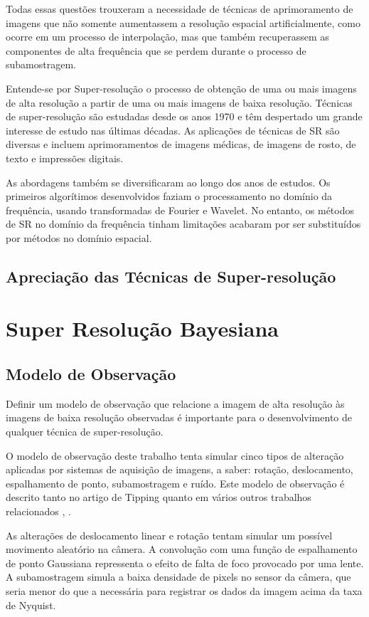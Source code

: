 \documentclass[12pt,openright,oneside,a4paper,english,brazil]{abntex2}
\begin{document}
Todas essas questões trouxeram a necessidade de técnicas de aprimoramento de imagens que não somente aumentassem a resolução espacial artificialmente, como ocorre em um processo de interpolação, mas que também recuperassem as componentes de alta frequência que se perdem durante o processo de subamostragem.

Entende-se por Super-resolução o processo de obtenção de uma ou mais imagens de alta resolução a partir de uma ou mais imagens de baixa resolução.
Técnicas de super-resolução são estudadas desde os anos 1970 e têm despertado um grande interesse de estudo nas últimas décadas.
As aplicações de técnicas de SR são diversas e incluem aprimoramentos de imagens médicas, de imagens de rosto, de texto e impressões digitais\cite{nasrollahi2014super}.

As abordagens também se diversificaram ao longo dos anos de estudos. Os primeiros algorítimos desenvolvidos faziam o processamento no domínio da frequência, usando transformadas de Fourier e Wavelet.
No entanto, os métodos de SR no domínio da frequência tinham limitações acabaram por ser substituídos por métodos no domínio espacial.



\section{Apreciação das Técnicas de Super-resolução}


\chapter{Super Resolução Bayesiana}
\section{Modelo de Observação}

Definir um modelo de observação que relacione a imagem de alta resolução às imagens de baixa resolução observadas é importante para o desenvolvimento de qualquer técnica de super-resolução.

O modelo de observação deste trabalho tenta simular cinco tipos de alteração aplicadas por sistemas de aquisição de imagens, a saber: rotação, deslocamento, espalhamento de ponto, subamostragem e ruído.
Este modelo de observação é descrito tanto no artigo de Tipping \cite{tipping2003bayesian} quanto em vários outros trabalhos relacionados \cite{pickup2007bayesian}, \cite{Capel01a}.

As alterações de deslocamento linear e rotação tentam simular um possível movimento aleatório na câmera.
A convolução com uma função de espalhamento de ponto Gaussiana repressenta o efeito de falta de foco provocado por uma lente.
A subamostragem simula a baixa densidade de pixels no sensor da câmera,
que seria menor do que a necessária para registrar os dados da imagem acima da taxa de Nyquist.
\end{document}

